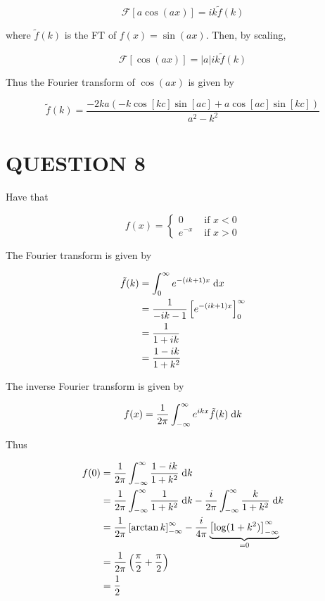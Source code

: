 \documentclass[a4paper]{article}
\begin{document}
\begin{enumerate}
	\[ \mathcal{F}[a\cos(ax)] = ik\tilde{f}(k) \]
	
	where $ \tilde{f}(k) $ is the FT of $ f(x) = \sin(ax) $. Then, by scaling,
	
	\[ \mathcal{F}[\cos(ax)] = | a | ik\tilde{f}(k) \]
	
	Thus the Fourier transform of $ \cos(ax) $ is given by
	
	\[ \tilde{f}(k) = \frac{-2ka \left(  - k \cos[kc]\sin[ac] + a \cos[ac]\sin[kc]   \right)}{a^{2} - k^{2}}  \]
	
	
	
\end{enumerate}

\section{QUESTION 8}

Have that

\[ f(x) = \begin{cases} 0  & \text{ if } x < 0 \\ e^{-x} & \text{ if } x > 0 \end{cases} \]

The Fourier transform is given by 

\begin{align*}
\tilde{f}(k) & = \int_{0}^{\infty} e^{-(ik + 1)x} \; \mathrm{d} x   \\
& = \frac{1}{-ik - 1}\left[  e^{-(ik + 1)x} \right]_{0}^{\infty} \\
& = \frac{1}{1 + ik } \\
& = \frac{1 - ik}{1 + k^{2}}
 \end{align*}
 
The inverse Fourier transform is given by

\[ f(x) = \frac{1}{2\pi} \int_{-\infty}^{\infty} e^{ikx} \tilde{f}(k) \; \mathrm{d} k  \]

Thus

\begin{align*}
f(0) & = \frac{1}{2\pi} \int_{-\infty}^{\infty}\frac{1 - ik}{1 + k^{2}} \; \mathrm{d} k   \\
& = \frac{1}{2\pi} \int_{-\infty}^{\infty} \frac{1}{1 + k^{2}} \; \mathrm{d} k  -  \frac{i}{2\pi} \int_{-\infty}^{\infty}  \frac{k}{1 + k^{2}} \; \mathrm{d} k   \\
& = \frac{1}{2\pi} \left[  \arctan k \right]_{-\infty}^{\infty} - \frac{i}{4\pi} \underbrace{\left[  \log (1 + k^{2}) \right]_{-\infty}^{\infty}}_{=0}  \\
& = \frac{1}{2\pi} \left(  \frac{\pi}{2} + \frac{\pi}{2} \right) \\
& = \frac{1}{2}
\end{align*}
\end{document}
